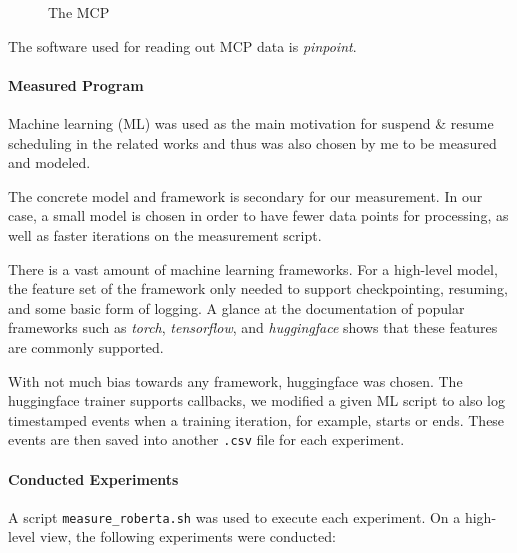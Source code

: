 \begin{figure}
    \caption[short]{The MCP}
    \label{fig:mcp}
\end{figure}


The software used for reading out MCP data is \emph{pinpoint}\cite{kohler_pinpoint_2020}.

\paragraph{Measured Program}

Machine learning (ML) was used as the main motivation for suspend \& resume scheduling in the related works\cite {wiesner_lets_2021} and thus was also chosen by me to be measured and modeled. 

The concrete model and framework is secondary for our measurement. In our case, a small model is chosen in order to have fewer data points for processing, as well as faster iterations on the measurement script. 

There is a vast amount of machine learning frameworks. 
For a high-level model, the feature set of the framework only needed to support checkpointing, resuming, and some basic form of logging. 
A glance at the documentation of popular frameworks such as \emph{torch}, \emph{tensorflow}, and \emph{huggingface} shows that these features are commonly supported. 

With not much bias towards any framework, huggingface was chosen.
The huggingface trainer supports callbacks, we modified a given ML script to also log timestamped events when a training iteration, for example, starts or ends. 
These events are then saved into another \verb|.csv| file for each experiment.

\paragraph{Conducted Experiments}

A script \verb|measure_roberta.sh| was used to execute each experiment. 
On a high-level view, the following experiments were conducted: 

